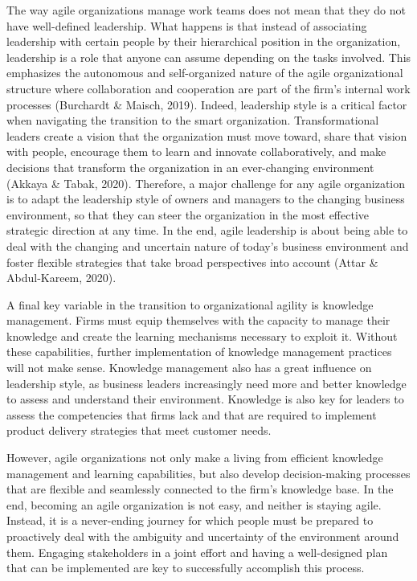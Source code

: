 \documentclass[
  letterpaper,
  DIV=11,
  numbers=noendperiod]{scrreprt}
\begin{document}
The way agile organizations manage work teams does not mean that they do
not have well-defined leadership. What happens is that instead of
associating leadership with certain people by their hierarchical
position in the organization, leadership is a role that anyone can
assume depending on the tasks involved. This emphasizes the autonomous
and self-organized nature of the agile organizational structure where
collaboration and cooperation are part of the firm's internal work
processes (Burchardt \& Maisch, 2019). Indeed, leadership style is a
critical factor when navigating the transition to the smart
organization. Transformational leaders create a vision that the
organization must move toward, share that vision with people, encourage
them to learn and innovate collaboratively, and make decisions that
transform the organization in an ever-changing environment (Akkaya \&
Tabak, 2020). Therefore, a major challenge for any agile organization is
to adapt the leadership style of owners and managers to the changing
business environment, so that they can steer the organization in the
most effective strategic direction at any time. In the end, agile
leadership is about being able to deal with the changing and uncertain
nature of today's business environment and foster flexible strategies
that take broad perspectives into account (Attar \& Abdul-Kareem, 2020).

A final key variable in the transition to organizational agility is
knowledge management. Firms must equip themselves with the capacity to
manage their knowledge and create the learning mechanisms necessary to
exploit it. Without these capabilities, further implementation of
knowledge management practices will not make sense. Knowledge management
also has a great influence on leadership style, as business leaders
increasingly need more and better knowledge to assess and understand
their environment. Knowledge is also key for leaders to assess the
competencies that firms lack and that are required to implement product
delivery strategies that meet customer needs.

However, agile organizations not only make a living from efficient
knowledge management and learning capabilities, but also develop
decision-making processes that are flexible and seamlessly connected to
the firm's knowledge base. In the end, becoming an agile organization is
not easy, and neither is staying agile. Instead, it is a never-ending
journey for which people must be prepared to proactively deal with the
ambiguity and uncertainty of the environment around them. Engaging
stakeholders in a joint effort and having a well-designed plan that can
be implemented are key to successfully accomplish this process.
\end{document}
